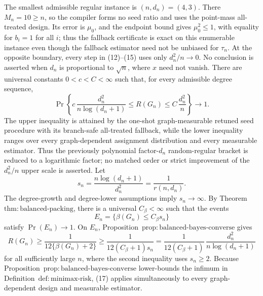 The smallest admissible regular instance is \((n,d_n)=(4,3)\).  There \(M_n=10\ge n\), so the compiler forms no seed ratio and uses the point-mass all-treated design.  Its error is \(\mu_0\), and the endpoint bound gives \(\mu_0^2\le1\), with equality for \(b_i=1\) for all \(i\); thus the fallback certificate is exact on this enumerable instance even though the fallback estimator need not be unbiased for \(\tau_n\).  At the opposite boundary, every step in (12)--(15) uses only \(d_n^2/n\to0\).  No conclusion is asserted when \(d_n\) is proportional to \(\sqrt n\), where \(x\) need not vanish.
There are universal constants \(0<c<C<\infty\) such that, for every admissible degree sequence,
\[
\Pr\!\left\{
c\,\frac{d_n^2}{n\log(d_n+1)}
\le R(G_n)\le
C\,\frac{d_n^2}{n}
\right\}\longrightarrow1.
\]
The upper inequality is attained by the one-shot graph-measurable retuned seed procedure with its branch-safe all-treated fallback, while the lower inequality ranges over every graph-dependent assignment distribution and every measurable estimator.  Thus the previously polynomial factor-\(d_n\) random-regular bracket is reduced to a logarithmic factor; no matched order or strict improvement of the \(d_n^2/n\) upper scale is asserted.
Let
\[
s_n=\frac{n\log(d_n+1)}{d_n^2}=\frac1{r(n,d_n)}.
\]
The degree-growth and degree-lower assumptions imply \(s_n\to\infty\).  By Theorem~\(\mathrm{thm{:}balanced\mbox{-}packing}\), there is a universal \(C_\beta<\infty\) such that the events
\[
E_n=\{\beta(G_n)\le C_\beta s_n\}
\]
satisfy \(\Pr(E_n)\to1\).  On \(E_n\), Proposition~\(\mathrm{prop{:}balanced\mbox{-}bayes\mbox{-}converse}\) gives
\[
R(G_n)\ge\frac1{12\{\beta(G_n)+2\}}
\ge\frac1{12(C_\beta+1)s_n}
=\frac1{12(C_\beta+1)}\,
\frac{d_n^2}{n\log(d_n+1)}
\tag{17}
\]
for all sufficiently large \(n\), where the second inequality uses \(s_n\ge2\).  Because Proposition~\(\mathrm{prop{:}balanced\mbox{-}bayes\mbox{-}converse}\) lower-bounds the infimum in Definition~\(\mathrm{def{:}minimax\mbox{-}risk}\), (17) applies simultaneously to every graph-dependent design and measurable estimator.

